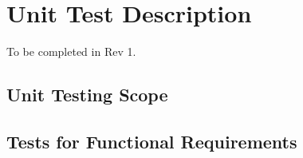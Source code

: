 \documentclass[12pt, titlepage]{article}
\begin{document}
\section {Unit Test Description}

To be completed in Rev 1.

\subsection{Unit Testing Scope}


\subsection{Tests for Functional Requirements}






					
					
					

\end{document}

